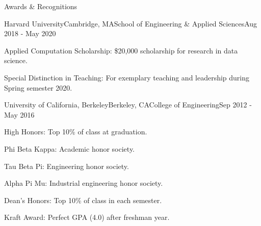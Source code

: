 \documentclass{resume} %
\begin{document}
\begin{rSection}{Awards \& Recognitions}

\begin{rSubsection}{Harvard University}{Cambridge, MA}{School of Engineering \& Applied Sciences}{Aug 2018 - May 2020}

\item Applied Computation Scholarship: \$20,000 scholarship for research in data science.
\item Special Distinction in Teaching: For exemplary teaching and leadership during Spring semester 2020.

\end{rSubsection}

\begin{rSubsection}{University of California, Berkeley}{Berkeley, CA}{College of Engineering}{Sep 2012 - May 2016}

\item High Honors: Top 10\% of class at graduation.
\item Phi Beta Kappa: Academic honor society.
\item Tau Beta Pi: Engineering honor society.
\item Alpha Pi Mu: Industrial engineering honor society.
\item Dean's Honors: Top 10\% of class in each semester.
\item Kraft Award: Perfect GPA (4.0) after freshman year.

\end{rSubsection}




\end{rSection}

\end{document}
